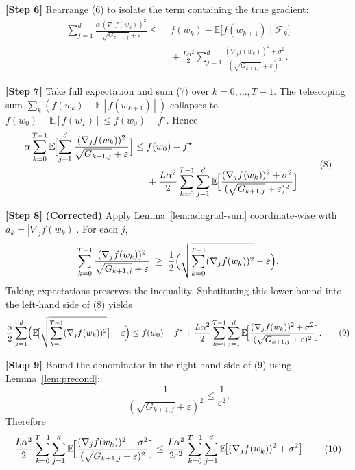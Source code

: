 \documentclass{article}
\newcommand{\E}{\mathbb{E}}
\begin{document}
\noindent\textbf{[Step 6]} Rearrange (6) to isolate the term containing the true
gradient:
\[
\begin{aligned}
\sum_{j=1}^{d}\frac{\alpha\,(\nabla_{j}f(w_{k}))^{2}}
                {\sqrt{G_{k+1,j}}+\varepsilon}
\le&\; f(w_{k})-\E\!\bigl[f(w_{k+1})\mid\mathcal{F}_{k}\bigr] \\
   &\;+\frac{L\alpha^{2}}{2}
      \sum_{j=1}^{d}\frac{(\nabla_{j}f(w_{k}))^{2}+\sigma^{2}}
                {(\sqrt{G_{k+1,j}}+\varepsilon)^{2}} .                     \tag{7}
\end{aligned}
\]

\noindent\textbf{[Step 7]} Take full expectation and sum (7) over $k=0,\dots,T-1$.
The telescoping sum $\sum_{k}(f(w_{k})-\E[f(w_{k+1})])$ collapses to
$f(w_{0})-\E[f(w_{T})]\le f(w_{0})-f^{\star}$.  Hence
\[
\begin{aligned}
\alpha\sum_{k=0}^{T-1}\E\!\Bigl[
        \sum_{j=1}^{d}\frac{(\nabla_{j}f(w_{k}))^{2}}
                     {\sqrt{G_{k+1,j}}+\varepsilon}
        \Bigr]
\le&\; f(w_{0})-f^{\star} \\
   &\;+\frac{L\alpha^{2}}{2}
      \sum_{k=0}^{T-1}\sum_{j=1}^{d}
      \E\!\Bigl[\frac{(\nabla_{j}f(w_{k}))^{2}+\sigma^{2}}
                {(\sqrt{G_{k+1,j}}+\varepsilon)^{2}}\Bigr].
\end{aligned}                                                               \tag{8}
\]

\noindent\textbf{[Step 8]}  \textbf{(Corrected)} Apply Lemma~\ref{lem:adagrad-sum}
coordinate‑wise with $a_{k}=|\nabla_{j}f(w_{k})|$.
For each $j$,
\[
\sum_{k=0}^{T-1}\frac{(\nabla_{j}f(w_{k}))^{2}}
                     {\sqrt{G_{k+1,j}}+\varepsilon}
\;\ge\;
\frac12\Bigl(\sqrt{\sum_{k=0}^{T-1}(\nabla_{j}f(w_{k}))^{2}}-\varepsilon\Bigr).
\]
Taking expectations preserves the inequality.  Substituting this lower bound
into the left‑hand side of (8) yields
\[
\frac{\alpha}{2}\sum_{j=1}^{d}
   \Bigl(\E\!\bigl[\sqrt{\sum_{k=0}^{T-1}(\nabla_{j}f(w_{k}))^{2}}\bigr]-\varepsilon\Bigr)
\le f(w_{0})-f^{\star}
   +\frac{L\alpha^{2}}{2}
      \sum_{k=0}^{T-1}\sum_{j=1}^{d}
      \E\!\Bigl[\frac{(\nabla_{j}f(w_{k}))^{2}+\sigma^{2}}
                {(\sqrt{G_{k+1,j}}+\varepsilon)^{2}}\Bigr].
                                                                    \tag{9}
\]

\noindent\textbf{[Step 9]} Bound the denominator in the right‑hand side of (9)
using Lemma~\ref{lem:precond}:
\[
\frac{1}{(\sqrt{G_{k+1,j}}+\varepsilon)^{2}}
\le\frac{1}{\varepsilon^{2}} .
\]
Therefore
\[
\begin{aligned}
\frac{L\alpha^{2}}{2}
\sum_{k=0}^{T-1}\sum_{j=1}^{d}
\E\!\Bigl[\frac{(\nabla_{j}f(w_{k}))^{2}+\sigma^{2}}
                {(\sqrt{G_{k+1,j}}+\varepsilon)^{2}}\Bigr]
\le
\frac{L\alpha^{2}}{2\varepsilon^{2}}
\sum_{k=0}^{T-1}\sum_{j=1}^{d}
\E\!\bigl[(\nabla_{j}f(w_{k}))^{2}+\sigma^{2}\bigr] .
\end{aligned}                                                               \tag{10}
\]
\end{document}
